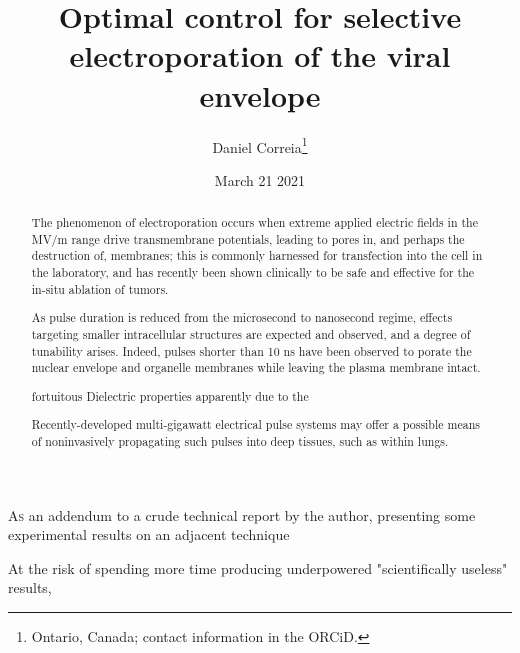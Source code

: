 \documentclass[fleqn,10pt]{paper}
\begin{document}
\title{Optimal control for selective electroporation of the viral envelope}
\author{\footnotesize{Daniel Correia}\footnote{Ontario, Canada; contact information in the ORCiD.}}
\date{\small{March 21 2021}}

\flushbottom 
\maketitle



\thispagestyle{empty}

\renewcommand{\abstractname}{Summary}    %

\begin{abstract}
	\noindent The phenomenon of electroporation occurs when extreme applied electric fields in the MV/m range drive transmembrane potentials, leading to pores in, and perhaps the destruction of, membranes; this is commonly harnessed for transfection into the cell in the laboratory, and has recently been shown clinically to be safe and effective for the in-situ ablation of tumors.
	
	\noindent As pulse duration is reduced from the microsecond to nanosecond regime, effects targeting smaller intracellular structures are expected and observed, and a degree of tunability arises. Indeed, pulses shorter than 10 ns have been observed to porate the nuclear envelope and organelle membranes while leaving the plasma membrane intact.
	
	fortuitous Dielectric properties apparently due to the 
	
	\noindent Recently-developed multi-gigawatt electrical pulse systems may offer a possible means of noninvasively propagating such pulses into deep tissues, such as within lungs. 
\end{abstract}


\lettrine{A}{s} an addendum to a crude technical report \cite{notes2021} by the author, presenting some experimental results on an adjacent technique

At the risk of spending more time producing underpowered "scientifically useless" results, 
\end{document}
